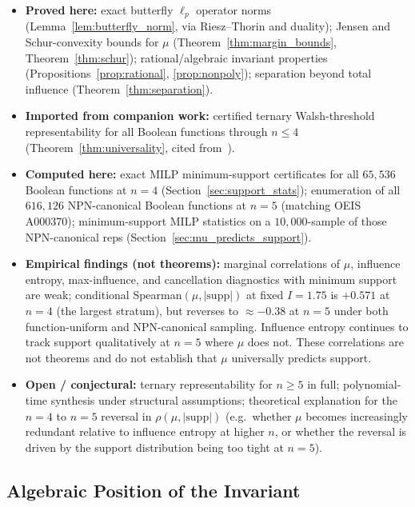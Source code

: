 \documentclass[11pt]{article}
\newcommand{\supp}{\mathrm{supp}}
\begin{document}
\begin{itemize}
    \item \textbf{Proved here:} exact butterfly $\ell_p$ operator norms (Lemma~\ref{lem:butterfly_norm}, via Riesz--Thorin and duality); Jensen and Schur-convexity bounds for $\mu$ (Theorem~\ref{thm:margin_bounds}, Theorem~\ref{thm:schur}); rational/algebraic invariant properties (Propositions~\ref{prop:rational}, \ref{prop:nonpoly}); separation beyond total influence (Theorem~\ref{thm:separation}).

    \item \textbf{Imported from companion work:} certified ternary Walsh-threshold representability for all Boolean functions through $n \le 4$ (Theorem~\ref{thm:universality}, cited from~\cite{spectralSynthesisCompanion}).

    \item \textbf{Computed here:} exact MILP minimum-support certificates for all $65{,}536$ Boolean functions at $n=4$ (Section~\ref{sec:support_stats}); enumeration of all $616{,}126$ NPN-canonical Boolean functions at $n=5$ (matching OEIS A000370); minimum-support MILP statistics on a $10{,}000$-sample of those NPN-canonical reps (Section~\ref{sec:mu_predicts_support}).

    \item \textbf{Empirical findings (not theorems):} marginal correlations of $\mu$, influence entropy, max-influence, and cancellation diagnostics with minimum support are weak; conditional Spearman$(\mu, |\supp|)$ at fixed $I = 1.75$ is $+0.571$ at $n=4$ (the largest stratum), but reverses to $\approx -0.38$ at $n=5$ under both function-uniform and NPN-canonical sampling. Influence entropy continues to track support qualitatively at $n=5$ where $\mu$ does not. These correlations are not theorems and do not establish that $\mu$ universally predicts support.

    \item \textbf{Open / conjectural:} ternary representability for $n \ge 5$ in full; polynomial-time synthesis under structural assumptions; theoretical explanation for the $n=4$ to $n=5$ reversal in $\rho(\mu, |\supp|)$ (e.g.\ whether $\mu$ becomes increasingly redundant relative to influence entropy at higher $n$, or whether the reversal is driven by the support distribution being too tight at $n=5$).
\end{itemize}

\subsection{Algebraic Position of the Invariant}
\end{document}
